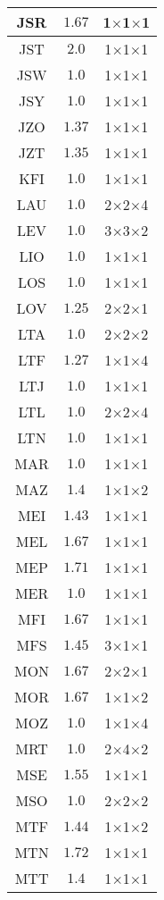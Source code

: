 \documentclass[main.tex]{subfiles}
\begin{document}
\begin{table}
{\begin{minipage}[t]{0.24\linewidth}
\begin{tabular}{|@{\hspace{2pt}}c@{\hspace{2pt}}|@{\hspace{2pt}}c@{\hspace{2pt}}|@{\hspace{2pt}}c@{\hspace{2pt}}|}
JSR&$1.67$&1$\times$1$\times$1\\\hline
JST&$2.0$&1$\times$1$\times$1\\\hline
JSW&$1.0$&1$\times$1$\times$1\\\hline
JSY&$1.0$&1$\times$1$\times$1\\\hline
JZO&$1.37$&1$\times$1$\times$1\\\hline
JZT&$1.35$&1$\times$1$\times$1\\\hline
KFI&$1.0$&1$\times$1$\times$1\\\hline
LAU&$1.0$&2$\times$2$\times$4\\\hline
LEV&$1.0$&3$\times$3$\times$2\\\hline
LIO&$1.0$&1$\times$1$\times$1\\\hline
LOS&$1.0$&1$\times$1$\times$1\\\hline
LOV&$1.25$&2$\times$2$\times$1\\\hline
LTA&$1.0$&2$\times$2$\times$2\\\hline
LTF&$1.27$&1$\times$1$\times$4\\\hline
LTJ&$1.0$&1$\times$1$\times$1\\\hline
LTL&$1.0$&2$\times$2$\times$4\\\hline
LTN&$1.0$&1$\times$1$\times$1\\\hline
MAR&$1.0$&1$\times$1$\times$1\\\hline
MAZ&$1.4$&1$\times$1$\times$2\\\hline
MEI&$1.43$&1$\times$1$\times$1\\\hline
MEL&$1.67$&1$\times$1$\times$1\\\hline
MEP&$1.71$&1$\times$1$\times$1\\\hline
MER&$1.0$&1$\times$1$\times$1\\\hline
MFI&$1.67$&1$\times$1$\times$1\\\hline
MFS&$1.45$&3$\times$1$\times$1\\\hline
MON&$1.67$&2$\times$2$\times$1\\\hline
MOR&$1.67$&1$\times$1$\times$2\\\hline
MOZ&$1.0$&1$\times$1$\times$4\\\hline
MRT&$1.0$&2$\times$4$\times$2\\\hline
MSE&$1.55$&1$\times$1$\times$1\\\hline
MSO&$1.0$&2$\times$2$\times$2\\\hline
MTF&$1.44$&1$\times$1$\times$2\\\hline
MTN&$1.72$&1$\times$1$\times$1\\\hline
MTT&$1.4$&1$\times$1$\times$1\\\hline

\end{tabular}
\end{minipage}}
\end{table}
\end{document}
